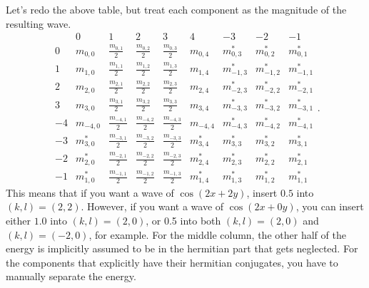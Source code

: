 \documentclass[11pt]{article}
\begin{document}
Let's redo the above table, but treat each component as the magnitude of the resulting wave.
\begin{equation}
\begin{array}{c|ccccc|ccc} & 0 & 1 & 2 & 3 & 4 & -3 & -2 & -1 \\ \hline
0 & m_{0,0} & \frac{m_{0,1}}{2} & \frac{m_{0,2}}{2}  & \frac{m_{0,3}}{2}  & m_{0,4}  & m_{0,3}^\ast & m_{0,2}^\ast & m_{0,1}^\ast \\
1 & m_{1,0} & \frac{m_{1,1}}{2} &\frac{ m_{1,2}}{2} & \frac{m_{1,3}}{2} & m_{1,4} & m_{-1,3}^\ast & m_{-1,2}^\ast & m_{-1,1}^\ast \\
2 & m_{2,0} & \frac{m_{2,1}}{2} & \frac{m_{2,2}}{2} & \frac{m_{2,3}}{2} & m_{2,4} & m_{-2,3}^\ast & m_{-2,2}^\ast & m_{-2,1}^\ast \\
3 & m_{3,0} & \frac{m_{3,1}}{2} & \frac{m_{3,2}}{2} & \frac{m_{3,3}}{2} & m_{3,4} & m_{-3,3}^\ast & m_{-3,2}^\ast & m_{-3,1}^\ast \\
-4 & m_{-4,0} & \frac{m_{-4,1}}{2} & \frac{m_{-4,2}}{2} & \frac{m_{-4,3}}{2} & m_{-4,4} & m_{-4,3}^\ast & m_{-4,2}^\ast & m_{-4,1}^\ast \\
-3 & m_{3,0}^\ast & \frac{m_{-3,1}}{2} & \frac{m_{-3,2}}{2} & \frac{m_{-3,3}}{2} & m_{3,4}^\ast & m_{3,3}^\ast & m_{3,2}^\ast & m_{3,1}^\ast \\
-2 & m_{2,0}^\ast & \frac{m_{-2,1}}{2} & \frac{m_{-2,2}}{2} & \frac{m_{-2,3}}{2} & m_{2,4}^\ast & m_{2,3}^\ast & m_{2,2}^\ast & m_{2,1}^\ast \\
-1 & m_{1,0}^\ast & \frac{m_{-1,1}}{2} & \frac{m_{-1,2}}{2} & \frac{m_{-1,3}}{2} & m_{1,4}^\ast & m_{1,3}^\ast & m_{1,2}^\ast & m_{1,1}^\ast\end{array}.
\end{equation}
This means that if you want a wave of $\cos( 2x+2y)$, insert $0.5$ into $(k,l)=(2,2)$. However, if you want a wave of $\cos( 2x+0y)$, you can insert either $1.0$ into $(k,l)=(2,0)$, or 0.5 into both $(k,l)=(2,0)$ and $(k,l)=(-2,0)$, for example. For the middle column, the other half of the energy is implicitly assumed to be in the hermitian part that gets neglected. For the components that explicitly have their hermitian conjugates, you have to manually separate the energy.
\end{document}

